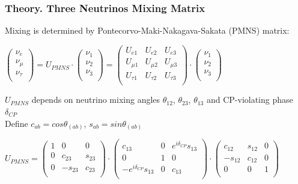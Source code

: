 \begin{frame}\frametitle{Theory. Three Neutrinos Mixing Matrix}
  \scriptsize
  Mixing is determined by Pontecorvo-Maki-Nakagava-Sakata (PMNS) matrix:\\
  \begin{center}
  $ \begin{pmatrix} \nu_{e} \\ \nu_{\mu} \\ \nu_{\tau} \\ \end{pmatrix}
  = U_{PMNS}\cdot \begin{pmatrix} \nu_{1} \\ \nu_{2} \\ \nu_{3} \\ \end{pmatrix} = 
  \begin{pmatrix}
  U_{e1} & U_{e2} & U_{e3} \\
  U_{\mu1} & U_{\mu2} & U_{\mu3} \\
  U_{\tau1} & U_{\tau2} & U_{\tau3} \\
  \end{pmatrix}
  \cdot
  \begin{pmatrix} \nu_{1} \\ \nu_{2} \\ \nu_{3} \\ \end{pmatrix}$\\
  \end{center}
  $U_{PMNS}$ depends on neutrino mixing angles $\theta_{12}$, $\theta_{23}$, $\theta_{13}$ and CP-violating phase $\delta_{CP}$\\
  Define $c_{ab}=cos\theta_(ab)$, $s_{ab}=sin\theta_(ab)$\\
  \begin{center}
  $U_{PMNS} =
  \begin{pmatrix}
  1 & 0 & 0 \\
  0 & c_{23} & s_{23} \\
  0 & -s_{23} & c_{23} \\
  \end{pmatrix}
  \cdot
  \begin{pmatrix}
  c_{13} & 0 & e^{i\delta_{CP}}s_{13} \\
  0 & 1 & 0 \\
  -e^{i\delta_{CP}}s_{13} & 0 & c_{13} \\
  \end{pmatrix}
  \cdot
  \begin{pmatrix}
  c_{12} & s_{12} & 0 \\
  -s_{12} & c_{12} & 0 \\
  0 & 0 & 1 \\
  \end{pmatrix}$ \\
  \end{center}
\end{frame} 

